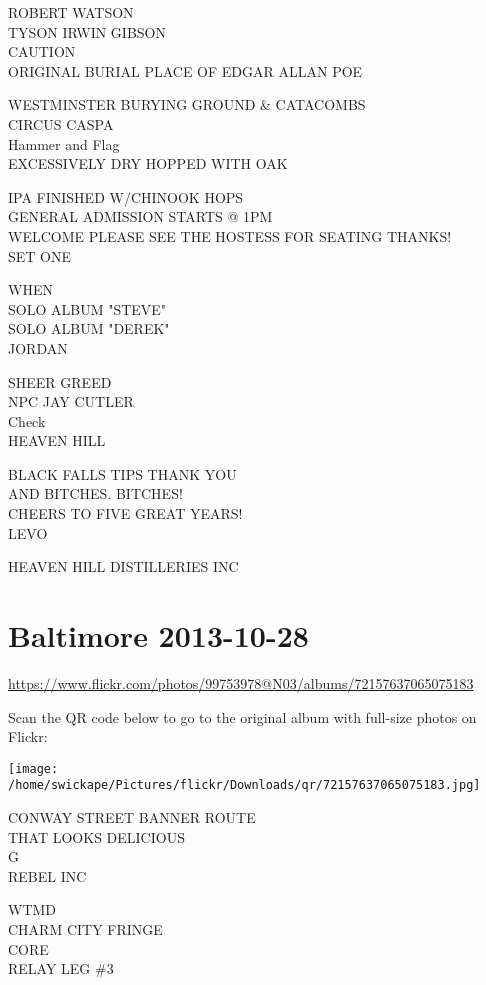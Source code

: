 \documentclass[10pt,letterpaper]{article}
\begin{document}
ROBERT WATSON\\
TYSON IRWIN GIBSON\\
CAUTION\\
ORIGINAL BURIAL PLACE OF EDGAR ALLAN POE

WESTMINSTER BURYING GROUND \& CATACOMBS\\
CIRCUS CASPA\\
Hammer and Flag\\
EXCESSIVELY DRY HOPPED WITH OAK

IPA FINISHED W/CHINOOK HOPS\\
GENERAL ADMISSION STARTS @ 1PM\\
WELCOME PLEASE SEE THE HOSTESS FOR SEATING THANKS!\\
SET ONE

WHEN\\
SOLO ALBUM "STEVE"\\
SOLO ALBUM "DEREK"\\
JORDAN

SHEER GREED\\
NPC JAY CUTLER\\
Check\\
HEAVEN HILL

BLACK FALLS TIPS THANK YOU\\
AND BITCHES.  BITCHES!\\
CHEERS TO FIVE GREAT YEARS!\\
LEVO

HEAVEN HILL DISTILLERIES INC


\section*{Baltimore 2013-10-28}

\url{https://www.flickr.com/photos/99753978@N03/albums/72157637065075183}

Scan the QR code below to go to the original album with full-size photos on Flickr:

\texttt{[image: /home/swickape/Pictures/flickr/Downloads/qr/72157637065075183.jpg]}


CONWAY STREET BANNER ROUTE\\
THAT LOOKS DELICIOUS\\
G\\
REBEL INC

WTMD\\
CHARM CITY FRINGE\\
CORE\\
RELAY LEG \#3
\end{document}
